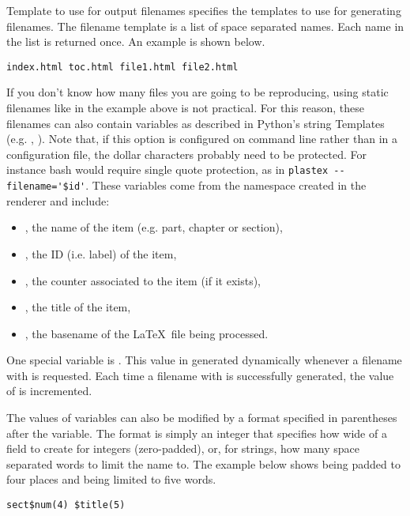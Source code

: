 \begin{configuration}{Template to use for output filenames}
specifies the templates to use for generating filenames.
The filename template is a list of space separated names.  Each name
in the list is returned once.  An example is shown below.

\begin{verbatim}
index.html toc.html file1.html file2.html
\end{verbatim}

If you don't know how many files you are going to be reproducing,
using static filenames like in the example above is not practical.
For this reason, these filenames can also contain variables as described in
Python's string Templates (e.g. , ).
Note that, if this option is configured on command line
rather than in a configuration file, the dollar characters probably need
to be protected. For instance bash would require single quote
protection, as in \verb+plastex --filename='$id'+.
These variables come from the namespace created in the renderer and
include:
\begin{itemize}
\item
{}, the name of the item (e.g. part, chapter or section),
\item
{}, the ID (i.e. label) of the item,
\item
{}, the counter associated to the item (if it exists),
\item
{}, the title of the item,
\item
{}, the basename of the \LaTeX\ file being processed.
\end{itemize}
One special variable is .  This value in generated dynamically
whenever a filename with  is requested.  Each time a filename
with  is successfully generated, the value of 
is incremented.

The values of variables can also be modified by a format specified
in parentheses after the variable.  The format is simply an integer
that specifies how wide of a field to create for integers
(zero-padded), or, for strings, how many space separated words
to limit the name to.  The example below shows  being padded
to four places and  being limited to five words.

\begin{verbatim}
sect$num(4) $title(5)
\end{verbatim}


\end{configuration}
